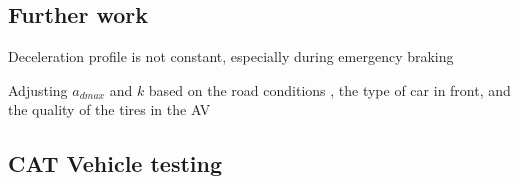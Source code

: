 \documentclass[conference]{IEEEtran}
\begin{document}
\subsection{Further work}
Deceleration profile is not constant, especially during emergency braking \cite{Akhilesh}

Adjusting $a_{dmax}$ and $k$ based on the road conditions \cite{road conditions}, the type of car in front, and the quality of the tires in the AV \cite{road conditions}

\subsection{CAT Vehicle testing}



\end{document}
